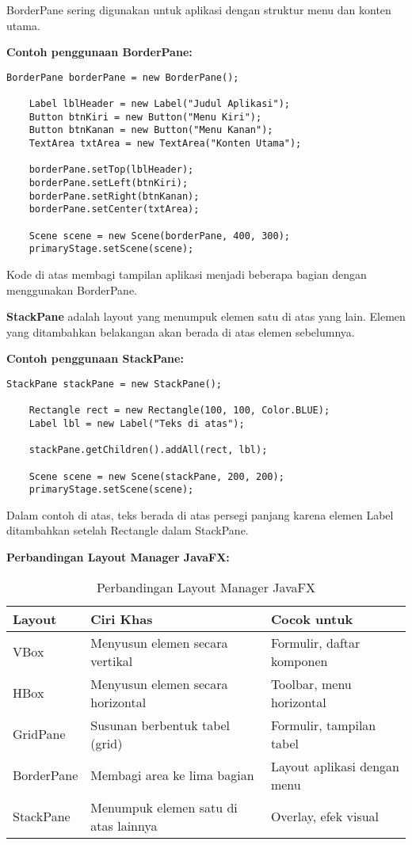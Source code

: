BorderPane sering digunakan untuk aplikasi dengan struktur menu dan konten utama.

\textbf{Contoh penggunaan BorderPane:}
\begin{lstlisting}[style=JavaStyle, caption=Menggunakan BorderPane dalam JavaFX]
	BorderPane borderPane = new BorderPane();
	
	Label lblHeader = new Label("Judul Aplikasi");
	Button btnKiri = new Button("Menu Kiri");
	Button btnKanan = new Button("Menu Kanan");
	TextArea txtArea = new TextArea("Konten Utama");
	
	borderPane.setTop(lblHeader);
	borderPane.setLeft(btnKiri);
	borderPane.setRight(btnKanan);
	borderPane.setCenter(txtArea);
	
	Scene scene = new Scene(borderPane, 400, 300);
	primaryStage.setScene(scene);
\end{lstlisting}

Kode di atas membagi tampilan aplikasi menjadi beberapa bagian dengan menggunakan BorderPane.

\textbf{StackPane} adalah layout yang menumpuk elemen satu di atas yang lain. Elemen yang ditambahkan belakangan akan berada di atas elemen sebelumnya.

\textbf{Contoh penggunaan StackPane:}
\begin{lstlisting}[style=JavaStyle, caption=Menumpuk elemen menggunakan StackPane]
	StackPane stackPane = new StackPane();
	
	Rectangle rect = new Rectangle(100, 100, Color.BLUE);
	Label lbl = new Label("Teks di atas");
	
	stackPane.getChildren().addAll(rect, lbl);
	
	Scene scene = new Scene(stackPane, 200, 200);
	primaryStage.setScene(scene);
\end{lstlisting}

Dalam contoh di atas, teks berada di atas persegi panjang karena elemen Label ditambahkan setelah Rectangle dalam StackPane.

\textbf{Perbandingan Layout Manager JavaFX:}

\begin{table}[h]
	\centering
	\begin{tabular}{|l|l|l|}
		\hline
		\textbf{Layout} & \textbf{Ciri Khas} & \textbf{Cocok untuk} \\
		\hline
		VBox & Menyusun elemen secara vertikal & Formulir, daftar komponen \\
		HBox & Menyusun elemen secara horizontal & Toolbar, menu horizontal \\
		GridPane & Susunan berbentuk tabel (grid) & Formulir, tampilan tabel \\
		BorderPane & Membagi area ke lima bagian & Layout aplikasi dengan menu \\
		StackPane & Menumpuk elemen satu di atas lainnya & Overlay, efek visual \\
		\hline
	\end{tabular}
	\caption{Perbandingan Layout Manager JavaFX}
\end{table}

